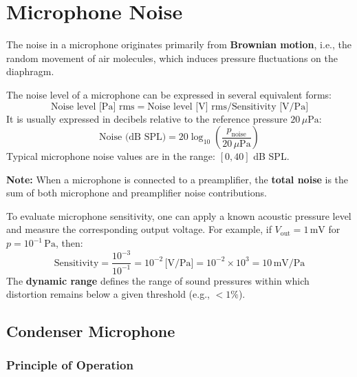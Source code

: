 \section{Microphone Noise}

The noise in a microphone originates primarily from \textbf{Brownian motion}, i.e., the random movement of air molecules, which induces pressure fluctuations on the diaphragm.

The noise level of a microphone can be expressed in several equivalent forms:
\[
\text{Noise level [Pa] rms} = \text{Noise level [V] rms} / \text{Sensitivity [V/Pa]}
\]
It is usually expressed in decibels relative to the reference pressure \( 20\,\mu\text{Pa} \):
\[
\text{Noise (dB SPL)} = 20 \log_{10} \left( \frac{p_{\text{noise}}}{20\,\mu\text{Pa}} \right)
\]
Typical microphone noise values are in the range: $[0, 40]$ dB SPL.

\textbf{Note:} When a microphone is connected to a preamplifier, the \textbf{total noise} is the sum of both microphone and preamplifier noise contributions.

To evaluate microphone sensitivity, one can apply a known acoustic pressure level and measure the corresponding output voltage.  
For example, if \( V_{\text{out}} = 1\,\text{mV} \) for \( p = 10^{-1}\,\text{Pa} \), then:
\[
\text{Sensitivity} = \frac{10^{-3}}{10^{-1}} = 10^{-2}\,\text{[V/Pa]} = 10^{-2} \times 10^3 = 10\,\text{mV/Pa}
\]
The \textbf{dynamic range} defines the range of sound pressures within which distortion remains below a given threshold (e.g., \(< 1\%\)).


\subsection{Condenser Microphone}

\subsubsection{Principle of Operation}

